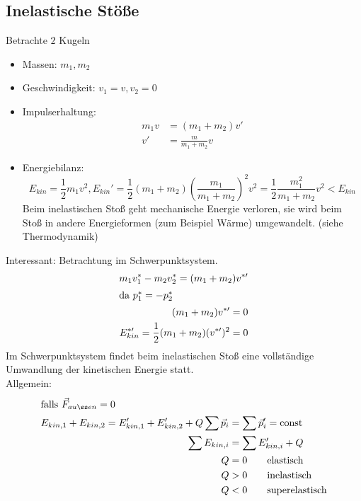 \documentclass[a4paper]{scrartcl}
\renewcommand{\v}[1]{\vec{#1}}
\theoremstyle{definition}
\theoremstyle{plain}
\theoremstyle{plain}
\theoremstyle{remark}
\theoremstyle{remark}
\theoremstyle{remark}
\begin{document}
\subsection{Inelastische Stöße}
\label{sec-7-3}
Betrachte $2$ Kugeln
\begin{itemize}
\item Massen: $m_1, m_2$
\item Geschwindigkeit: $v_1 = v, v_2 = 0$
\item Impulserhaltung:
\begin{align*}
m_1 v &= (m_1 +  m_2) v' \\
v' &= \frac{m}{m_1 + m_2} v
\end{align*}
\item Energiebilanz:
\[E_{kin} = \frac{1}{2} m_1 v^2, E_{kin}' = \frac{1}{2} (m_1 + m_2) (\frac{m_1}{m_1 + m_2})^2 v^2 = \frac{1}{2} \frac{m_1^2}{m_1 + m_2}v^2 < E_{kin}\]
Beim inelastischen Stoß geht mechanische Energie verloren, sie wird beim Stoß in andere Energieformen (zum Beispiel Wärme) umgewandelt. (siehe Thermodynamik)
\end{itemize}
Interessant:
Betrachtung im Schwerpunktsystem.
\begin{align*}
m_1 v_1^\ast - m_2 v_2^\ast = (m_1 + m_2) v^{\ast\prime} \\
\intertext{da $p_1^\ast = -p_2^\ast$}
(m_1 + m_2) v^{\ast\prime} = 0 \\
E_{kin}^{\ast\prime} = \frac{1}{2}(m_1 + m_2)(v^{\ast\prime})^2 = 0
\end{align*}
Im Schwerpunktsystem findet beim inelastischen Stoß eine vollständige Umwandlung der kinetischen Energie statt. \\
   Allgemein:
\begin{align*}
\intertext{falls $\v F_{außen} =0$}
E_{kin,1} + E_{kin,2} = E_{kin,1}' + E_{kin,2}' + Q
\sum \v p_i &= \sum \v p'_i = \text{const} \\
\sum E_{kin,i} &= \sum E'_{kin,i} + Q \\
Q &= 0 \tag*{elastisch} \\
Q &> 0 \tag*{inelastisch} \\
Q &< 0 \tag*{superelastisch} \\
\end{align*}
\end{document}
